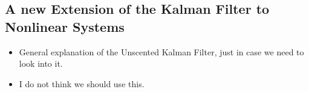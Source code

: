 \subsection{A new Extension of the Kalman Filter to Nonlinear Systems}
\begin{itemize}
	\item General explanation of the Unscented Kalman Filter, just in case we need to look into it.
	\item I do not think we should use this.
\end{itemize}

